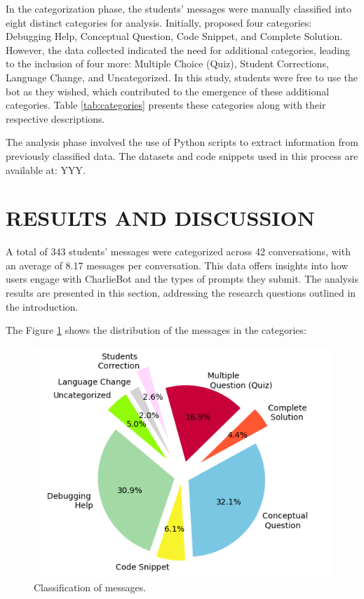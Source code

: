 \documentclass[a4paper,twoside]{article}
\begin{document}
In the categorization phase, the students' messages were manually classified
into eight distinct categories for analysis. Initially, \cite{Ghimire24}
proposed four categories: Debugging Help, Conceptual Question, Code Snippet,
and Complete Solution. However, the data collected indicated the need for
additional categories, leading to the inclusion of four more: Multiple Choice
(Quiz), Student Corrections, Language Change, and Uncategorized. In this study,
students were free to use the bot as they wished, which contributed to the
emergence of these additional categories. Table \ref{tab:categories} presents
these categories along with their respective descriptions.

The analysis phase involved the use of Python scripts to extract information
from previously classified data. The datasets and code snippets used in this
process are available at: YYY.

\section{\uppercase{Results and Discussion}}

A total of 343 students' messages were categorized across 42 conversations, with
an average of 8.17 messages per conversation. This data offers insights into how
users engage with CharlieBot and the types of prompts they submit. The analysis
results are presented in this section, addressing the research questions
outlined in the introduction.

The Figure \ref{fig:graph1} shows the distribution of the messages in the
categories:

\begin{figure}[h!]
    \centering
    \includegraphics[scale=0.62]{img/figure1.png}
    \caption{Classification of messages.}
    \label{fig:graph1}
\end{figure}
\end{document}
